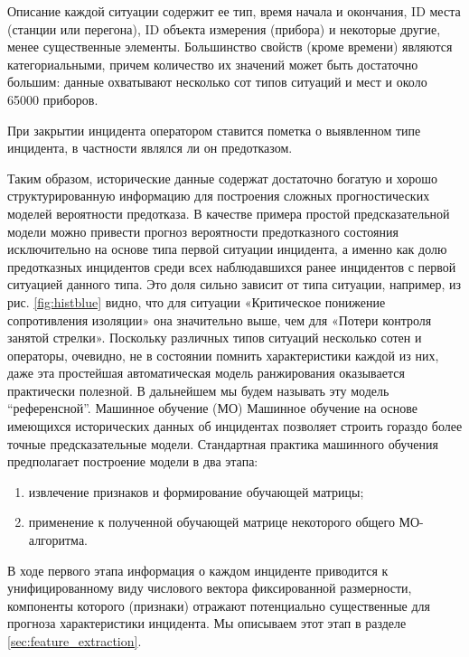 Описание каждой ситуации содержит ее тип, время начала и окончания,
ID места (станции или перегона), ID объекта измерения (прибора) и некоторые другие, менее существенные элементы. Большинство свойств (кроме времени) являются категориальными, причем количество их значений может быть достаточно большим: данные охватывают несколько сот типов ситуаций и мест и около 65000 приборов.

При закрытии инцидента оператором ставится пометка о выявленном типе инцидента, в частности являлся ли он предотказом.

Таким образом, исторические данные содержат достаточно богатую и хорошо структурированную информацию для построения сложных прогностических моделей вероятности предотказа.
В качестве примера простой предсказательной модели можно привести прогноз вероятности предотказного состояния исключительно на основе типа первой ситуации инцидента, а именно как долю предотказных инцидентов среди всех наблюдавшихся ранее инцидентов с первой ситуацией данного типа. Это доля сильно зависит от типа ситуации, например, из рис. \ref{fig:histblue} видно, что для ситуации «Критическое понижение сопротивления изоляции» она значительно выше, чем для «Потери контроля занятой стрелки». Поскольку различных типов ситуаций несколько сотен и операторы, очевидно, не в состоянии помнить характеристики каждой из них, даже эта простейшая автоматическая модель ранжирования оказывается практически полезной. В дальнейшем мы будем называть эту модель ``референсной''.
Машинное обучение (МО) Машинное обучение на основе имеющихся исторических данных об инцидентах позволяет строить гораздо более точные предсказательные модели. Стандартная практика машинного обучения \cite{hastie01statisticallearning, Mitchell:1997:ML:541177, scikit-learn} предполагает построение модели в два этапа:
\begin{enumerate}
\item извлечение признаков и формирование обучающей матрицы;
\item применение к полученной обучающей матрице некоторого общего МО-алгоритма.
\end{enumerate}
В ходе первого этапа информация о каждом инциденте приводится к унифицированному виду числового вектора фиксированной размерности, компоненты которого (признаки) отражают потенциально существенные для прогноза характеристики инцидента. Мы описываем этот этап в разделе \ref{sec:feature_extraction}.

